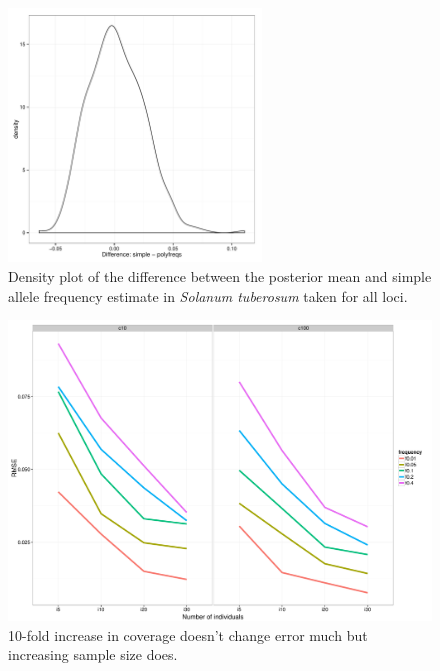 \documentclass[]{article}
\begin{document}
\begin{figure}[b]
\centering
\includegraphics[width=0.6\textwidth]{pdf/figS3}
\caption{Density plot of the difference between the posterior mean and simple allele frequency estimate in \textit{Solanum tuberosum} taken for all loci.}
\end{figure}

\begin{figure}[b]
\centering
\includegraphics[width=\textwidth]{pdf/figS4}
\caption{10-fold increase in coverage doesn't change error much but increasing sample size does.}
\end{figure}
\end{document}
